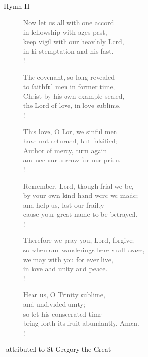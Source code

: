 Hymn II
\begin{verse}
Now let us all with one accord\\
in fellowship with ages past,\\
keep vigil with our heav'nly Lord,\\
in hi stemptation and his fast.\\!

The covenant, so long revealed \\
to faithful men in former time,\\
Christ by his own example sealed,\\
the Lord of love, in love sublime.\\!

This love, O Lor, we sinful men\\
have not returned, but falsified;\\
Author of mercy, turn again\\
and see our sorrow for our pride.\\!

Remember, Lord, though frial we be,\\
by your own kind hand were we made;\\
and help us, lest our frailty\\
cause your great name to be betrayed.\\!

Therefore we pray you, Lord, forgive;\\
so when our wanderings here shall cease,\\
we may with you for ever live,\\
in love and unity and peace.\\!

Hear us, O Trinity sublime,\\
and undivided unity;\\
so let his consecrated time\\
bring forth its fruit abundantly. Amen.\\!
\end{verse}
\begin{flushright}\tiny -attributed to St Gregory the Great\end{flushright}


